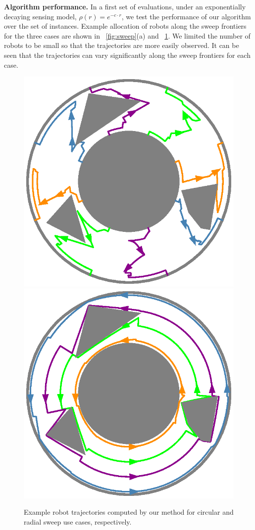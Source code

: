 \textbf{Algorithm performance.} In a first set of evaluations, under an exponentially 
decaying sensing 
model, $\rho(r) = e^{-c\cdot r}$, we test the performance of our algorithm over 
the set of instances. Example allocation of robots along the sweep frontiers for 
the three cases are shown in ~\ref{fig:sweep}(a) and ~\ref{fig:simulations}. 
We limited the number of robots to be small so that the trajectories are more easily 
observed. It can be seen that the trajectories can vary significantly along the 
sweep frontiers for each case. 
\begin{figure}[ht]
    \centering
    \includegraphics[width=.45\linewidth]{chapters/sc/fig/circular_sol.eps}\hspace{2mm}
    \includegraphics[width=.45\linewidth]{chapters/sc/fig/rotational_sol.eps}
    
    \caption{Example robot trajectories computed by our method for circular and radial 
    sweep use cases, respectively.
    }
    \label{fig:simulations}
\end{figure}


